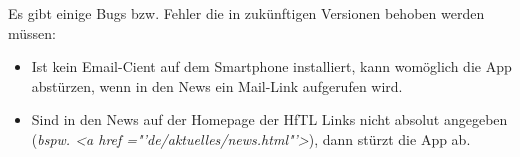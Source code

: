 \begin{description}
Es gibt einige Bugs bzw. Fehler die in zukünftigen Versionen behoben werden müssen:
\begin{itemize}
\item Ist kein Email-Cient auf dem Smartphone installiert, kann womöglich die App abstürzen, wenn in den News ein Mail-Link aufgerufen wird.
\item Sind in den News auf der Homepage der HfTL Links nicht absolut angegeben (\textit{bspw. \textless a href ="'de/aktuelles/news.html"'\textgreater}), dann stürzt die App ab. 
\end{itemize}
\end{description} 
